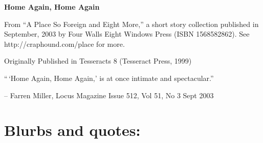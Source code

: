 

\newenvironment{authorof}{\begin{flushright}\sffamily}{\end{flushright}}


\begin{center}
\textbf{\huge\textsf{
Home Again, Home Again
}}
\end{center}


\noindent

From ``A Place So Foreign and Eight More,'' a short story
collection published in September, 2003 by Four Walls Eight Windows
Press (ISBN 1568582862). See http://craphound.com/place for more.

Originally Published in Tesseracts 8 (Tesseract Press, 1999)

\bigskip\bigskip

``\,`Home Again, Home Again,' is at once intimate and spectacular.''

\begin{authorof}
-- Farren Miller,  Locus Magazine  Issue 512, Vol 51, No 3
  Sept 2003 
\end{authorof}

\section{Blurbs and quotes:}

